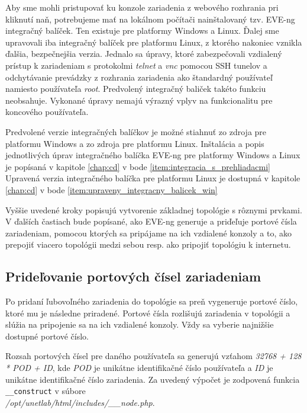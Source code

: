 \begin{enumerate}[noitemsep]
    Aby sme mohli pristupovať ku konzole zariadenia z webového rozhrania pri kliknutí naň, potrebujeme mať na lokálnom počítači nainštalovaný tzv. EVE-ng integračný balíček. Ten existuje pre platformy Windows a Linux. Ďalej sme upravovali iba integračný balíček pre platformu Linux, z ktorého nakoniec vznikla ďalšia, bezpečnejšia verzia. Jednalo sa úpravy, ktoré zabezpečovali vzdialený prístup k zariadeniam s protokolmi \emph{telnet} a \emph{vnc} pomocou SSH tunelov a odchytávanie prevádzky z rozhrania zariadenia ako štandardný používateľ namiesto používateľa \emph{root}. Predvolený integračný baliček takéto funkciu neobsahuje. Vykonané úpravy nemajú výrazný vplyv na funkcionalitu pre koncového používateľa.
    
    Predvolené verzie integračných balíčkov je možné stiahnuť zo zdroja \cite{eve_ng_integration_pack_win} pre platformu Windows a zo zdroja \cite{eve_ng_integration_pack_linux} pre platformu Linux. Inštalácia a popis jednotlivých úprav integračného balíčka EVE-ng pre platformy Windows a Linux je popísaná v kapitole \ref{chap:cd} v bode \ref{item:integracia_s_prehliadacmi} Upravená verzia integračného balíčka pre platformu Linux je dostupná v kapitole \ref{chap:cd} v bode \ref{item:upraveny_integracny_balicek_win}

\end{enumerate}

Vyššie uvedené kroky popisujú vytvorenie základnej topológie s rôznymi prvkami. V ďalších častiach bude popísané, ako EVE-ng generuje a priďeľuje portové čísla zariadeniam, pomocou ktorých sa pripájame na ich vzdialené konzoly a to, ako prepojiť viacero topológii medzi sebou resp. ako pripojiť topológiu k internetu.




\subsection{Prideľovanie portových čísel zariadeniam}
\label{chap:priradovanie_portovych_cisel}

Po pridaní ľubovoľného zariadenia do topológie sa preň vygeneruje portové číslo, ktoré mu je následne priradené. Portové čísla rozlišujú zariadenia v topológii a  slúžia na pripojenie sa na ich vzdialené konzoly. Vždy sa vyberie najnižšie dostupné portové číslo.

Rozsah portových čísel pre daného používateľa sa generujú vzťahom \emph{32768 + 128 * POD + ID}, kde \emph{POD} je unikátne identifikačné číslo používateľa a \emph{ID} je unikátne identifikačné číslo zariadenia. Za uvedený výpočet je zodpovená funkcia \texttt{\_\_construct} v súbore \\ \emph{/opt/unetlab/html/includes/\_\_node.php}.

